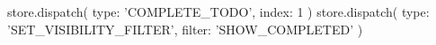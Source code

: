 store.dispatch({
  type: 'COMPLETE_TODO',
  index: 1
})
store.dispatch({
  type: 'SET_VISIBILITY_FILTER',
  filter: 'SHOW_COMPLETED'
})